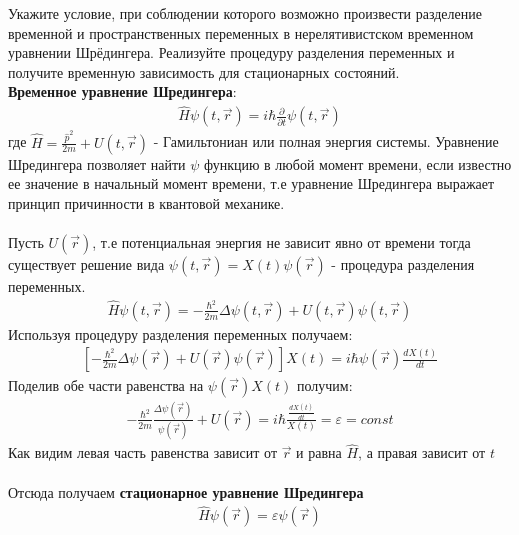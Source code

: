 \documentclass[__main__.tex]{subfiles}
\begin{document}
	
	Укажите условие, при соблюдении которого возможно произвести разделение временной и пространственных переменных в нерелятивистском временном уравнении Шрёдингера. Реализуйте процедуру разделения переменных и получите временную зависимость для стационарных состояний.\\ 
	
	\textbf{Временное уравнение Шредингера}:
	\begin{gather*}
	\hat{H}\psi(t,\vec{r}) = i\hbar\frac{\partial}{\partial t}\psi(t,\vec{r})
	\end{gather*}
	где $\hat{H} = \frac{\hat{p}^2}{2m}+U(t,\vec{r})$ - Гамильтониан или полная энергия системы.
	Уравнение Шредингера позволяет найти $\psi$ функцию в любой момент времени, если известно ее значение в начальный момент времени, т.е уравнение Шредингера выражает принцип причинности в квантовой механике.\\\\
	Пусть $U(\vec{r})$, т.е потенциальная энергия не зависит явно от времени тогда существует решение вида $\psi(t,\vec{r})=X(t)\psi(\vec{r})$ - процедура разделения переменных.
	\begin{gather*}
	\hat{H}\psi(t,\vec{r})=-\frac{\hbar^2}{2m}\Delta\psi(t,\vec{r})+U(t,\vec{r})\psi(t,\vec{r})
	\end{gather*}
	Используя процедуру разделения переменных получаем:
	\begin{gather*}
	\left[-\frac{\hbar^2}{2m}\Delta\psi(\vec{r})+U(\vec{r})\psi(\vec{r})\right]X(t)=i\hbar \psi(\vec{r})\frac{dX(t)}{dt}
	\end{gather*}
	Поделив обе части равенства на $\psi(\vec{r})X(t)$ получим:
	\begin{gather*}
	-\frac{\hbar^2}{2m}\frac{\Delta\psi(\vec{r})}{\psi(\vec{r})}+U(\vec{r})=i\hbar\frac{\frac{dX(t)}{dt}}{X(t)} = \varepsilon = const
	\end{gather*}
	Как видим левая часть равенства зависит от $\vec{r}$ и равна $\hat{H}$, а правая зависит от $t$\\\\
	Отсюда получаем \textbf{стационарное уравнение Шредингера}
	\begin{gather*}
	\hat{H}\psi(\vec{r}) = \varepsilon\psi(\vec{r})
	\end{gather*}
	
\end{document}
